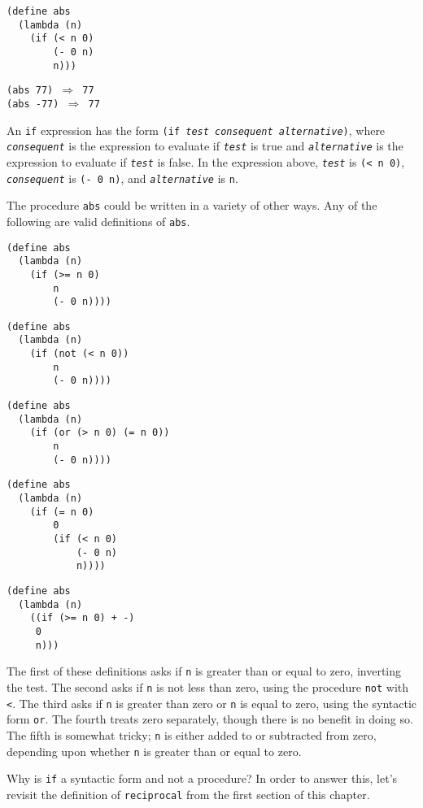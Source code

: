 \begin{alltt}
(define abs
  (lambda (n)
    (if (\textless{} n 0)
        (- 0 n)
        n)))

(abs 77) \(\Rightarrow\) 77
(abs -77) \(\Rightarrow\) 77
\end{alltt}


An \texttt{if} expression has the form
\texttt{(if \textit{test} \textit{consequent} \textit{alternative})}, where
\texttt{\textit{consequent}} is the expression to evaluate if \texttt{\textit{test}} is true
and 
\texttt{\textit{alternative}} is the expression to evaluate if \texttt{\textit{test}} is false.
In the expression above, \texttt{\textit{test}} is \texttt{(\textless{} n 0)}, \texttt{\textit{consequent}}
is \texttt{(- 0 n)}, and \texttt{\textit{alternative}} is \texttt{n}.


The procedure \texttt{abs} could be written in a variety of other ways.
Any of the following are valid definitions of \texttt{abs}.


\begin{alltt}
(define abs
  (lambda (n)
    (if (\textgreater{}= n 0)
        n
        (- 0 n))))

(define abs
  (lambda (n)
    (if (not (\textless{} n 0))
        n
        (- 0 n))))

(define abs
  (lambda (n)
    (if (or (\textgreater{} n 0) (= n 0))
        n
        (- 0 n))))

(define abs
  (lambda (n)
    (if (= n 0)
        0
        (if (\textless{} n 0)
            (- 0 n)
            n))))

(define abs
  (lambda (n)
    ((if (\textgreater{}= n 0) + -)
     0
     n)))
\end{alltt}


The first of these definitions asks if \texttt{n} is greater
than or equal to zero, inverting the test.
The second asks if \texttt{n} is not less than zero, using the procedure
\label{start_s100}\texttt{not} with \texttt{\textless{}}.
The third asks if \texttt{n} is greater than zero or \texttt{n} is equal to
zero, using the syntactic form \label{start_s101}\texttt{or}.
The fourth treats zero separately, though there is no benefit in doing so.
The fifth is somewhat tricky; \texttt{n} is either added to or subtracted from
zero, depending upon whether \texttt{n} is greater than or equal to zero.


Why is \label{start_s102}\texttt{if} a syntactic form and not a procedure?
In order to answer this, let's revisit the definition of
\texttt{reciprocal} from the first section of this chapter.


